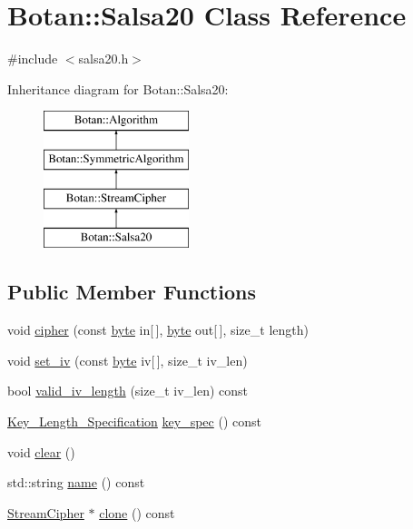 \hypertarget{classBotan_1_1Salsa20}{\section{Botan\-:\-:Salsa20 Class Reference}
\label{classBotan_1_1Salsa20}
}


{\ttfamily \#include $<$salsa20.\-h$>$}

Inheritance diagram for Botan\-:\-:Salsa20\-:\begin{figure}[H]
\begin{center}
\leavevmode
\includegraphics[height=4.000000cm]{classBotan_1_1Salsa20}
\end{center}
\end{figure}
\subsection*{Public Member Functions}
\begin{DoxyCompactItemize}
\item 
void \hyperlink{classBotan_1_1Salsa20_ac100bcf5883f84b102231ed749c770fc}{cipher} (const \hyperlink{namespaceBotan_a7d793989d801281df48c6b19616b8b84}{byte} in\mbox{[}$\,$\mbox{]}, \hyperlink{namespaceBotan_a7d793989d801281df48c6b19616b8b84}{byte} out\mbox{[}$\,$\mbox{]}, size\-\_\-t length)
\item 
void \hyperlink{classBotan_1_1Salsa20_a9c1b26b03d601ebabe8873e0c1155824}{set\-\_\-iv} (const \hyperlink{namespaceBotan_a7d793989d801281df48c6b19616b8b84}{byte} iv\mbox{[}$\,$\mbox{]}, size\-\_\-t iv\-\_\-len)
\item 
bool \hyperlink{classBotan_1_1Salsa20_a2a33127742dc2ace54e9d7e7d7c68b23}{valid\-\_\-iv\-\_\-length} (size\-\_\-t iv\-\_\-len) const 
\item 
\hyperlink{classBotan_1_1Key__Length__Specification}{Key\-\_\-\-Length\-\_\-\-Specification} \hyperlink{classBotan_1_1Salsa20_ae2b19a252eefd91f143fcf7ad3d65baa}{key\-\_\-spec} () const 
\item 
void \hyperlink{classBotan_1_1Salsa20_a9894f616ea764f299efea1c0a43fec42}{clear} ()
\item 
std\-::string \hyperlink{classBotan_1_1Salsa20_a74f08494fa054fdd9613891187a5812b}{name} () const 
\item 
\hyperlink{classBotan_1_1StreamCipher}{Stream\-Cipher} $\ast$ \hyperlink{classBotan_1_1Salsa20_ac973d0e968a8877460de781a32c96b86}{clone} () const 
\end{DoxyCompactItemize}


